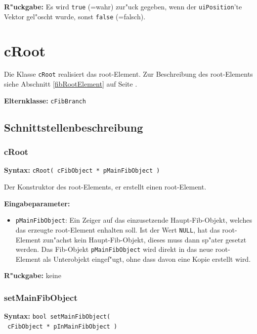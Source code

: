 \bigskip\noindent
\textbf{R"uckgabe:} Es wird \verb|true| (=wahr) zur"uck gegeben, wenn der \verb|uiPosition|'te Vektor gel"oscht wurde, sonst \verb|false| (=falsch).



\section{cRoot}

Die Klasse \verb|cRoot| realisiert das root-Element.
Zur Beschreibung des root-Elements siehe Abschnitt \ref{fibRootElement} auf Seite \pageref{fibRootElement} .

\bigskip\noindent
\textbf{Elternklasse:} \verb|cFibBranch|


\subsection{Schnittstellenbeschreibung}

\subsubsection{cRoot}

\textbf{Syntax:} \verb|cRoot( cFibObject * pMainFibObject )|

\bigskip\noindent
Der Konstruktor des root-Elements, er erstellt einen root-Element.

\bigskip\noindent
\textbf{Eingabeparameter:}
\begin{itemize}
 \item \verb|pMainFibObject|: Ein Zeiger auf das einzusetzende Haupt-Fib-Objekt, welches das erzeugte root-Element enhalten soll. Ist der Wert \verb|NULL|, hat das  root-Element zun"achst kein Haupt-Fib-Objekt, dieses muss dann sp"ater gesetzt werden. Das Fib-Objekt \verb|pMainFibObject| wird direkt in das neue root-Element als Unterobjekt eingef"ugt, ohne dass davon eine Kopie erstellt wird.
\end{itemize}


\bigskip\noindent
\textbf{R"uckgabe:} keine



\subsubsection{setMainFibObject}

\textbf{Syntax:} \verb|bool setMainFibObject(| \\\verb| cFibObject * pInMainFibObject )|

